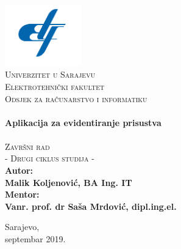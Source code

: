 \begin{titlepage}
\begin{center}


\includegraphics[width=0.25\textwidth]{material/etf-logo.png}~\\[0.1cm]
\textsc{\Large Univerzitet u Sarajevu}\\[0.2cm]  
\textsc{\Large Elektrotehnički fakultet}\\[0.2cm] 
\textsc{\Large Odsjek za računarstvo i informatiku}\\[3cm]\HRule \\[0.5cm] 
{\huge \bfseries Aplikacija za evidentiranje prisustva} \\[0.4cm] 
\HRule \\[0.5cm]

\textsc{\Large Završni rad}\\[0.4cm]
\textsc{\Large - Drugi ciklus studija - }\\[1.5cm]

\textbf{ 
\Large Autor:\\  
\Large Malik Koljenović, BA Ing. IT\\[1cm]  
\Large Mentor: \\[0.2cm] 
\Large Vanr. prof. dr Saša Mrdović, dipl.ing.el.} 
\vfill

{\large Sarajevo, \\septembar 2019.}

\end{center} 
\end{titlepage}